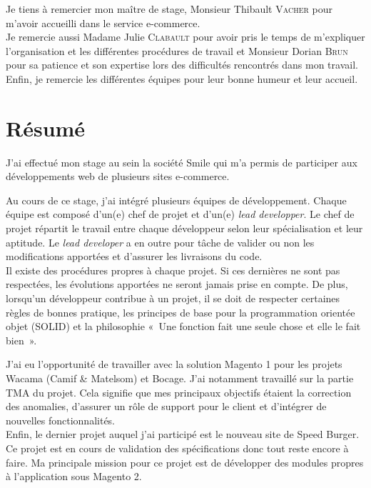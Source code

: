 \documentclass[12pt, a4paper, twoside]{report}
\newcommand{\mychapter}[2]{
	\setcounter{chapter}{#1}
	\setcounter{section}{0}
	\chapter*{#2}
	\addcontentsline{toc}{chapter}{#2}
}
\begin{document}
Je tiens à remercier mon maître de stage, Monsieur Thibault \textsc{Vacher} pour m'avoir accueilli dans le service e-commerce. \\

Je remercie aussi Madame Julie \textsc{Clabault} pour avoir pris le temps de m'expliquer l'organisation et les différentes procédures de travail et Monsieur Dorian \textsc{Brun} pour sa patience et son expertise lors des difficultés rencontrés dans mon travail. \\

Enfin, je remercie les différentes équipes pour leur bonne humeur et leur accueil.


\newpage\null\thispagestyle{empty}\newpage

\setcounter{tocdepth}{2}
\begingroup\makeatletter
\def\@makeschapterhead#1{%
	{\parindent \z@ \raggedright
		\normalfont
		\interlinepenalty\@M
		\Huge \bfseries  #1\par\nobreak
}}\makeatother
\tableofcontents
\endgroup




\mychapter{-4}{Résumé}

J’ai effectué mon stage au sein la société Smile qui m'a permis de participer aux développements web de plusieurs sites e-commerce. \vspace{0.1cm}

Au cours de ce stage, j'ai intégré plusieurs équipes de développement. Chaque équipe est composé d'un(e) chef de projet et d'un(e) \textit{lead developper}. Le chef de projet répartit le travail entre chaque développeur selon leur spécialisation et leur aptitude. Le \textit{lead developer} a en outre pour tâche de valider ou non les modifications apportées et d'assurer les livraisons du code. \\
Il existe des procédures propres à chaque projet. Si ces dernières ne sont pas respectées, les évolutions apportées ne seront jamais prise en compte. De plus, lorsqu'un développeur contribue à un projet, il se doit de respecter certaines règles de bonnes pratique, les principes de base pour la programmation orientée objet (SOLID) et la philosophie « Une fonction fait une seule chose et elle le fait bien ». \vspace{0.1cm}

J'ai eu l'opportunité de travailler avec la solution Magento 1 pour les projets Wacama (Camif \& Matelsom) et Bocage. J'ai notamment travaillé sur la partie TMA du projet. Cela signifie que mes principaux objectifs étaient la correction des anomalies, d'assurer un rôle de support pour le client et d'intégrer de nouvelles fonctionnalités. \\
Enfin, le dernier projet auquel j'ai participé est le nouveau site de Speed Burger. Ce projet est en cours de validation des spécifications donc tout reste encore à faire. Ma principale mission pour ce projet est de développer des modules propres à l'application sous Magento 2. \vspace{0.1cm}
\end{document}
